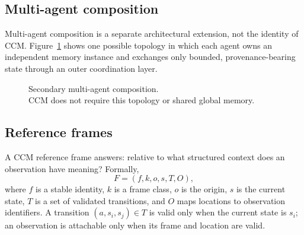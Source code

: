 \subsection{Multi-agent composition}

Multi-agent composition is a separate architectural extension, not the identity of CCM. Figure~\ref{fig:multi-agent} shows one possible topology in which each agent owns an independent memory instance and exchanges only bounded, provenance-bearing state through an outer coordination layer.

\begin{figure}[t]
\centering
{}%
\caption{Secondary multi-agent composition.\\CCM does not require this topology or shared global memory.}
\label{fig:multi-agent}
\end{figure}

\subsection{Reference frames}

A CCM reference frame answers: relative to what structured context does an observation have meaning? Formally,
\[
  F=(f,k,o,s,T,O),
\]
where $f$ is a stable identity, $k$ is a frame class, $o$ is the origin, $s$ is the current state, $T$ is a set of validated transitions, and $O$ maps locations to observation identifiers. A transition $(a,s_i,s_j)\in T$ is valid only when the current state is $s_i$; an observation is attachable only when its frame and location are valid.

